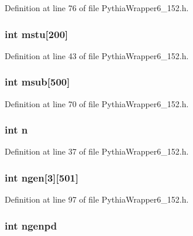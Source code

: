 Definition at line 76 of file Pythia\-Wrapper6\_\-152.h.
\subsubsection{\setlength{\rightskip}{0pt plus 5cm}int {\bf mstu}[200]}\label{PythiaWrapper6__152_8h_54fee093d39e3b7961c31466f751ea2b}




Definition at line 43 of file Pythia\-Wrapper6\_\-152.h.
\subsubsection{\setlength{\rightskip}{0pt plus 5cm}int {\bf msub}[500]}\label{PythiaWrapper6__152_8h_56d0f8258ff29bbe062b22cc48da1b3d}




Definition at line 70 of file Pythia\-Wrapper6\_\-152.h.
\subsubsection{\setlength{\rightskip}{0pt plus 5cm}int {\bf n}}\label{PythiaWrapper6__152_8h_76f11d9a0a47b94f72c2d0e77fb32240}




Definition at line 37 of file Pythia\-Wrapper6\_\-152.h.
\subsubsection{\setlength{\rightskip}{0pt plus 5cm}int {\bf ngen}[3][501]}\label{PythiaWrapper6__152_8h_b6cfdc75a985515bb64ad1d2f60d834a}




Definition at line 97 of file Pythia\-Wrapper6\_\-152.h.
\subsubsection{\setlength{\rightskip}{0pt plus 5cm}int {\bf ngenpd}}\label{PythiaWrapper6__152_8h_acc239405f0dbe2c68b579839c03a395}




